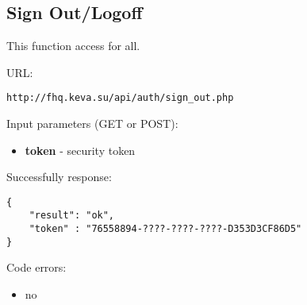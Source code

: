 \subsection{Sign Out/Logoff}
\par

This function access for all.

URL:
\begin{Verbatim}[frame=single]
http://fhq.keva.su/api/auth/sign_out.php
\end{Verbatim}

Input parameters (GET or POST):
\begin{itemize}
  \item \textbf{token} - security token
\end{itemize}

Successfully response:  \\
\begin{Verbatim}[frame=single]
{
    "result": "ok",
    "token" : "76558894-????-????-????-D353D3CF86D5"
}
\end{Verbatim}

Code errors:
\begin{itemize}
	\item no
\end{itemize}
